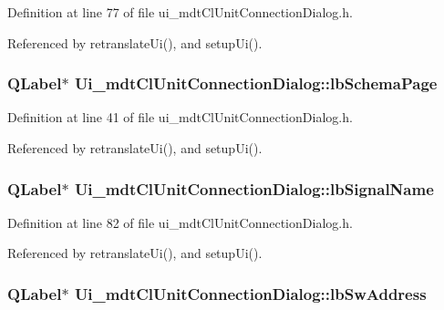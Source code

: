 Definition at line 77 of file ui\-\_\-mdt\-Cl\-Unit\-Connection\-Dialog.\-h.



Referenced by retranslate\-Ui(), and setup\-Ui().

\hypertarget{class_ui__mdt_cl_unit_connection_dialog_a5d8f668f9a3b9ace171bda47c4e97ea4}{
\subsubsection[{lb\-Schema\-Page}]{\setlength{\rightskip}{0pt plus 5cm}Q\-Label$\ast$ Ui\-\_\-mdt\-Cl\-Unit\-Connection\-Dialog\-::lb\-Schema\-Page}}\label{class_ui__mdt_cl_unit_connection_dialog_a5d8f668f9a3b9ace171bda47c4e97ea4}


Definition at line 41 of file ui\-\_\-mdt\-Cl\-Unit\-Connection\-Dialog.\-h.



Referenced by retranslate\-Ui(), and setup\-Ui().

\hypertarget{class_ui__mdt_cl_unit_connection_dialog_a3bd4f5a49ae25bb621e2d2cba70c311f}{
\subsubsection[{lb\-Signal\-Name}]{\setlength{\rightskip}{0pt plus 5cm}Q\-Label$\ast$ Ui\-\_\-mdt\-Cl\-Unit\-Connection\-Dialog\-::lb\-Signal\-Name}}\label{class_ui__mdt_cl_unit_connection_dialog_a3bd4f5a49ae25bb621e2d2cba70c311f}


Definition at line 82 of file ui\-\_\-mdt\-Cl\-Unit\-Connection\-Dialog.\-h.



Referenced by retranslate\-Ui(), and setup\-Ui().

\hypertarget{class_ui__mdt_cl_unit_connection_dialog_ae214f352127ef47f8d492a431c25ff27}{
\subsubsection[{lb\-Sw\-Address}]{\setlength{\rightskip}{0pt plus 5cm}Q\-Label$\ast$ Ui\-\_\-mdt\-Cl\-Unit\-Connection\-Dialog\-::lb\-Sw\-Address}}\label{class_ui__mdt_cl_unit_connection_dialog_ae214f352127ef47f8d492a431c25ff27}


